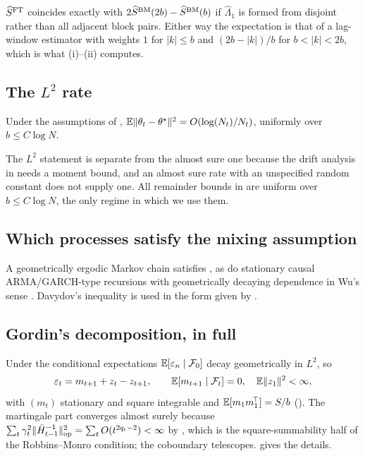 $\widehat{S}^{\mathrm{FT}}$ coincides exactly with $2\widehat{S}^{\mathrm{BM}}(2b)-\widehat{S}^{\mathrm{BM}}(b)$ if $\hat\Lambda_1$ is formed from disjoint rather
than all adjacent block pairs. Either way the expectation is that of a lag-window estimator with
weights $1$ for $|k|\le b$ and $(2b-|k|)/b$ for $b<|k|<2b$, which is what (i)--(ii)
computes.

\subsection{The \texorpdfstring{$L^2$}{L2} rate}
\label{app:l2}

\begin{theorem}[$L^2$ rate]
\label{thm:l2}
Under the assumptions of , $\mathbb{E}\lVert \theta_t-\theta^\star \rVert^2=O(\log(N_t)/N_t)$,
uniformly over $b\le C\log N$.
\end{theorem}

The $L^2$ statement is separate from the almost sure one because the drift analysis in
 needs a moment bound, and an almost sure rate with an unspecified random constant does
not supply one. All remainder bounds in  are uniform over $b\le C\log N$, the only
regime in which we use them.

\subsection{Which processes satisfy the mixing assumption}
\label{app:mixproc}

A geometrically ergodic Markov chain \citep{meyn2009markov} satisfies , as do stationary
causal ARMA/GARCH-type recursions with geometrically decaying dependence in Wu's sense
\citep{wu2005nonlinear,wu2011asymptotic}. Davydov's inequality is used in the form given by
\citet{rio1993covariance}.

\subsection{Gordin's decomposition, in full}
\label{app:gordin}

Under  the conditional expectations $\mathbb{E}[\varepsilon_{n}\mid\mathcal{F}_0]$ decay geometrically in
$L^2$, so
\begin{equation}
\varepsilon_t=m_{t+1}+z_t-z_{t+1},
\qquad \mathbb{E}[m_{t+1}\mid\mathcal{F}_t]=0,\quad \mathbb{E}\lVert z_1 \rVert^2<\infty,
\label{eq:cobound}
\end{equation}
with $(m_t)$ stationary and square integrable and $\mathbb{E}[m_1m_1^{\!\top}]=S/b$ (). The
martingale part converges almost surely because
$\sum_t\gamma_t^2\lVert \bar{H}_{t-1}^{-1} \rVert_{\mathrm{op}}^2=\sum_tO(t^{2q_{\mathrm r}-2})<\infty$ by , which is the
square-summability half of the Robbins--Monro condition; the coboundary telescopes. 
gives the details.
